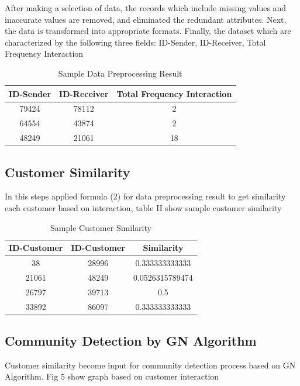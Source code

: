 \documentclass[conference]{IEEEtran}
\begin{document}
After making a selection of data, the records which include missing values and inaccurate values are removed, and eliminated the redundant attributes. Next, the data is transformed into appropriate formats. Finally, the dataset which are characterized by the following three fields: ID-Sender, ID-Receiver, Total Frequency Interaction

\begin{table}[h]
\renewcommand{\arraystretch}{1.3}
\caption{Sample Data Preprocessing Result}
\label{tab:sample_data_preprocessing_result}
\centering
\begin{tabular}{c|c|c}
    \hline
    ID-Sender  &  ID-Receiver & Total Frequency Interaction\\
    \hline
    79424 & 78112 & 2\\
    \hline
    64554 & 43874 & 2\\
    \hline
    48249 & 21061 & 18\\
    \hline
\end{tabular}
\end{table}

\subsection{Customer Similarity}
In this steps applied formula (2) for data preprocessing result to get similarity each customer based on interaction, table II show sample customer similarity

\begin{table}[h]
\renewcommand{\arraystretch}{1.3}
\caption{Sample Customer Similarity}
\label{tab:sample_customer_similarity}
\centering
\begin{tabular}{c|c|c}
    \hline
    ID-Customer  &  ID-Customer & Similarity\\
    \hline
    38 & 28996 & 0.333333333333\\
    \hline
    21061 & 48249 & 0.0526315789474\\
    \hline
    26797 & 39713 & 0.5\\
    \hline
    33892 & 86097 & 0.333333333333\\
    \hline
\end{tabular}
\end{table}

\subsection{Community Detection by GN Algorithm}
Customer similarity become input for community detection process based on GN Algorithm. Fig 5 show graph based on customer interaction
\end{document}
